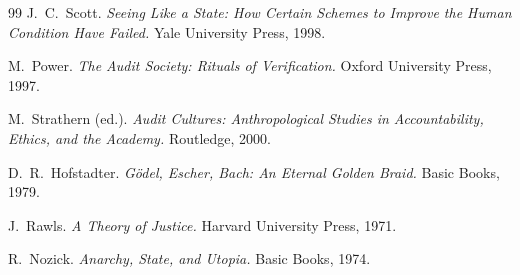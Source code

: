 \documentclass[12pt,a4paper]{article}
\theoremstyle{remark}
\begin{document}
\begin{thebibliography}{99}
J.~C.~Scott.
\textit{Seeing Like a State: How Certain Schemes to Improve the Human Condition Have Failed.}
Yale University Press, 1998.

M.~Power.
\textit{The Audit Society: Rituals of Verification.}
Oxford University Press, 1997.

M.~Strathern (ed.).
\textit{Audit Cultures: Anthropological Studies in Accountability, Ethics, and the Academy.}
Routledge, 2000.

D.~R.~Hofstadter.
\textit{G\"{o}del, Escher, Bach: An Eternal Golden Braid.}
Basic Books, 1979.

J.~Rawls.
\textit{A Theory of Justice.}
Harvard University Press, 1971.

R.~Nozick.
\textit{Anarchy, State, and Utopia.}
Basic Books, 1974.

\end{thebibliography}
\end{document}
